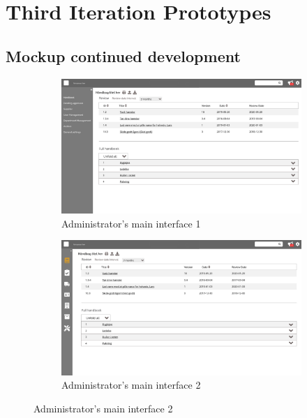 \chapter{Third Iteration Prototypes} \label{chap:3-Prototypes}
\section{Mockup continued development}\label{sec:2Mock}
\begin{figure}[H]
	\centering
	\begin{subfigure}[b]{0.48\textwidth}
		\includegraphics[width=\textwidth]{billeder/iteration3Prototyper/Page_11.jpg}
		\caption{Administrator's main interface 1}
		\label{fig:5-Main1}
	\end{subfigure}
	\quad
	\begin{subfigure}[b]{0.48\textwidth}
		\includegraphics[width=\textwidth]{billeder/iteration3Prototyper/Page_13.jpg}
		\caption{Administrator's main interface 2}
		\label{fig:5-Main2}
	\end{subfigure}
\end{figure}
